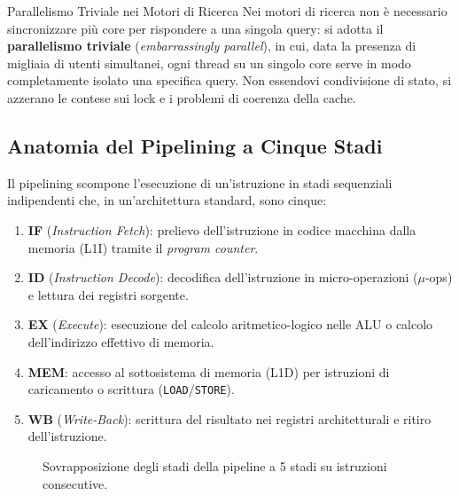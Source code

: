 \begin{noteblock}{Parallelismo Triviale nei Motori di Ricerca}
Nei motori di ricerca non \`e necessario sincronizzare pi\`u core per rispondere a una singola query: si adotta il \textbf{parallelismo triviale} (\textit{embarrassingly parallel}), in cui, data la presenza di migliaia di utenti simultanei, ogni thread su un singolo core serve in modo completamente isolato una specifica query. Non essendovi condivisione di stato, si azzerano le contese sui lock e i problemi di coerenza della cache.
\end{noteblock}

\subsection{Anatomia del Pipelining a Cinque Stadi}

Il pipelining scompone l'esecuzione di un'istruzione in stadi sequenziali indipendenti che, in un'architettura standard, sono cinque:

\begin{enumerate}
    \item \textbf{IF} (\textit{Instruction Fetch}): prelievo dell'istruzione in codice macchina dalla memoria (L1I) tramite il \textit{program counter}.
    \item \textbf{ID} (\textit{Instruction Decode}): decodifica dell'istruzione in micro-operazioni ($\mu$-ops) e lettura dei registri sorgente.
    \item \textbf{EX} (\textit{Execute}): esecuzione del calcolo aritmetico-logico nelle ALU o calcolo dell'indirizzo effettivo di memoria.
    \item \textbf{MEM}: accesso al sottosistema di memoria (L1D) per istruzioni di caricamento o scrittura (\texttt{LOAD}/\texttt{STORE}).
    \item \textbf{WB} (\textit{Write-Back}): scrittura del risultato nei registri architetturali e ritiro dell'istruzione.
\end{enumerate}

\begin{figure}[htbp]
\centering
{}
\caption{Sovrapposizione degli stadi della pipeline a 5 stadi su istruzioni consecutive.}
\label{fig:pipeline-5-stadi}
\end{figure}

